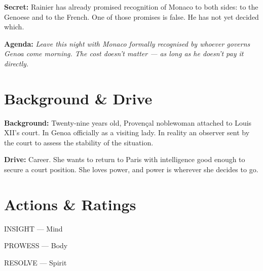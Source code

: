 \clearpage
\begin{secretbox}
\textbf{Secret:} Rainier has already promised recognition of Monaco to both sides:
to the Genoese and to the French. One of those promises is false. He has not yet
decided which.

\medskip\noindent\textcolor{SecretRed}{\textbf{Agenda:}} \textit{Leave this night
with Monaco formally recognised by whoever governs Genoa come morning. The cost
doesn't matter --- as long as he doesn't pay it directly.}
\end{secretbox}

\clearpage


\section*{Background \& Drive}
\begin{rulebox}{}
\textbf{Background:} Twenty-nine years old, Provençal noblewoman attached to Louis
XII's court. In Genoa officially as a visiting lady. In reality an observer sent
by the court to assess the stability of the situation.

\medskip\noindent\textcolor{GrimaldiPurple}{\textbf{Drive:}} Career. She wants to
return to Paris with intelligence good enough to secure a court position. She loves
power, and power is wherever she decides to go.
\end{rulebox}

\section*{Actions \& Ratings}
\begin{attributoblock}[GrimaldiPurple]{INSIGHT --- Mind}
\end{attributoblock}
\begin{attributoblock}[GrimaldiPurple]{PROWESS --- Body}
\end{attributoblock}
\begin{attributoblock}[GrimaldiPurple]{RESOLVE --- Spirit}
\end{attributoblock}


